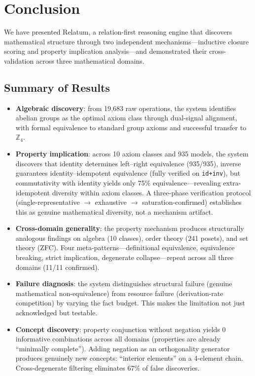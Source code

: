 \section{Conclusion}
\label{sec:conclusion}

We have presented Relatum, a relation-first reasoning engine that discovers mathematical structure through two independent mechanisms---inductive closure scoring and property implication analysis---and demonstrated their cross-validation across three mathematical domains.

\subsection{Summary of Results}

\begin{itemize}
\item \textbf{Algebraic discovery}: from 19{,}683 raw operations, the system identifies abelian groups as the optimal axiom class through dual-signal alignment, with formal equivalence to standard group axioms and successful transfer to $\mathbb{Z}_4$.

\item \textbf{Property implication}: across 10 axiom classes and 935 models, the system discovers that identity determines left--right equivalence (935/935), inverse guarantees identity--idempotent equivalence (fully verified on \texttt{id+inv}), but commutativity with identity yields only 75\% equivalence---revealing extra-idempotent diversity within axiom classes. A three-phase verification protocol (single-representative $\to$ exhaustive $\to$ saturation-confirmed) establishes this as genuine mathematical diversity, not a mechanism artifact.

\item \textbf{Cross-domain generality}: the property mechanism produces structurally analogous findings on algebra (10 classes), order theory (241 posets), and set theory (ZFC). Four meta-patterns---definitional equivalence, equivalence breaking, strict implication, degenerate collapse---repeat across all three domains (11/11 confirmed).

\item \textbf{Failure diagnosis}: the system distinguishes structural failure (genuine mathematical non-equivalence) from resource failure (derivation-rate competition) by varying the fact budget. This makes the limitation not just acknowledged but testable.

\item \textbf{Concept discovery}: property conjunction without negation yields 0 informative combinations across all domains (properties are already ``minimally complete''). Adding negation as an orthogonality generator produces genuinely new concepts: ``interior elements'' on a 4-element chain. Cross-degenerate filtering eliminates 67\% of false discoveries.
\end{itemize}

